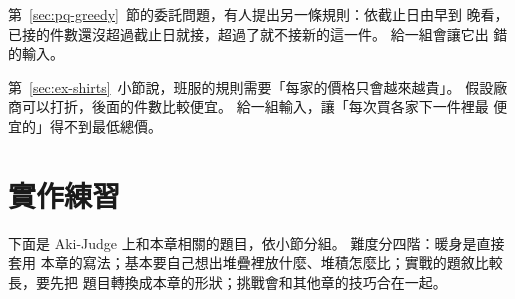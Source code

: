 \begin{drills}[label=drills:ch6]
\item 第~\ref{sec:pq-greedy}~節的委託問題，有人提出另一條規則：依截止日由早到
晚看，已接的件數還沒超過截止日就接，超過了就不接新的這一件。 給一組會讓它出
錯的輸入。

\item 第~\ref{sec:ex-shirts}~小節說，班服的規則需要「每家的價格只會越來越貴」。
假設廠商可以打折，後面的件數比較便宜。 給一組輸入，讓「每次買各家下一件裡最
便宜的」得不到最低總價。
\end{drills}

\section{實作練習}
\label{sec:ch6-practice}

下面是 Aki-Judge 上和本章相關的題目，依小節分組。 難度分四階：暖身是直接套用
本章的寫法；基本要自己想出堆疊裡放什麼、堆積怎麼比；實戰的題敘比較長，要先把
題目轉換成本章的形狀；挑戰會和其他章的技巧合在一起。

